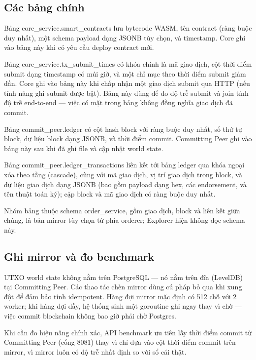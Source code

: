 \subsection{Các bảng chính}

Bảng core\_service.smart\_contracts lưu bytecode WASM, tên contract (ràng
buộc duy nhất), một schema payload dạng JSONB tùy chọn, và timestamp. Core
ghi vào bảng này khi có yêu cầu deploy contract mới.

Bảng core\_service.tx\_submit\_times có khóa chính là mã giao dịch, cột thời
điểm submit dạng timestamp có múi giờ, và một chỉ mục theo thời điểm submit
giảm dần. Core ghi vào bảng này khi chấp nhận một giao dịch submit qua HTTP
(nếu tính năng ghi submit được bật). Bảng này dùng để đo độ trễ submit và
join tính độ trễ end-to-end --- việc có mặt trong bảng không đồng nghĩa giao
dịch đã commit.

Bảng commit\_peer.ledger có cột hash block với ràng buộc duy nhất, số thứ tự
block, dữ liệu block dạng JSONB, và thời điểm commit. Committing Peer ghi vào
bảng này sau khi đã ghi file và cập nhật world state.

Bảng commit\_peer.ledger\_transactions liên kết tới bảng ledger qua khóa
ngoại xóa theo tầng (cascade), cùng với mã giao dịch, vị trí giao dịch trong
block, và dữ liệu giao dịch dạng JSONB (bao gồm payload dạng hex, các
endorsement, và tên thuật toán ký); cặp block và mã giao dịch có ràng buộc
duy nhất.

Nhóm bảng thuộc schema order\_service, gồm giao dịch, block và liên kết giữa
chúng, là bản mirror tùy chọn từ phía orderer; Explorer hiện không đọc schema
này.

\subsection{Ghi mirror và đo benchmark}

UTXO world state không nằm trên PostgreSQL --- nó nằm trên đĩa (LevelDB) tại
Committing Peer. Các thao tác chèn mirror dùng cú pháp bỏ qua khi xung đột để
đảm bảo tính idempotent. Hàng đợi mirror mặc định có 512 chỗ với 2 worker; khi
hàng đợi đầy, hệ thống sinh một goroutine ghi ngay thay vì chờ --- việc commit
blockchain không bao giờ phải chờ Postgres.

Khi cần đo hiệu năng chính xác, API benchmark ưu tiên lấy thời điểm commit từ
Committing Peer (cổng 8081) thay vì chỉ dựa vào cột thời điểm commit trên
mirror, vì mirror luôn có độ trễ nhất định so với sổ cái thật.


